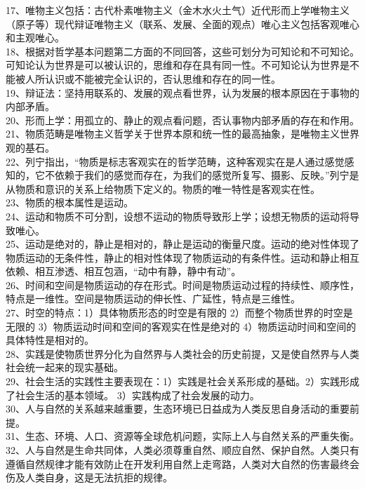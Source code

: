 \documentclass[a4paper,fleqn]{article}
\begin{document}
17、唯物主义包括：古代朴素唯物主义（金木水火土气）近代形而上学唯物主义（原子等）现代辩证唯物主义（联系、发展、全面的观点）唯心主义包括客观唯心和主观唯心。 \\
18、根据对哲学基本问题第二方面的不同回答，这些可划分为可知论和不可知论。可知论认为世界是可以被认识的，思维和存在具有同一性。不可知论认为世界是不能被人所认识或不能被完全认识的，否认思维和存在的同一性。 \\
19、辩证法：坚持用联系的、发展的观点看世界，认为发展的根本原因在于事物的内部矛盾。 \\
20、形而上学：用孤立的、静止的观点看问题，否认事物内部矛盾的存在和作用。 \\
21、物质范畴是唯物主义哲学关于世界本原和统一性的最高抽象，是唯物主义世界观的基石。 \\
22、列宁指出，“物质是标志客观实在的哲学范畴，这种客观实在是人通过感觉感知的，它不依赖于我们的感觉而存在，为我们的感觉所复写、摄影、反映。”列宁是从物质和意识的关系上给物质下定义的。物质的唯一特性是客观实在性。 \\
23、物质的根本属性是运动。 \\
24、运动和物质不可分割，设想不运动的物质导致形上学；设想无物质的运动将导致唯心。 \\
25、运动是绝对的，静止是相对的，静止是运动的衡量尺度。运动的绝对性体现了物质运动的无条件性，静止的相对性体现了物质运动的有条件性。运动和静止相互依赖、相互渗透、相互包涵，“动中有静，静中有动”。 \\
26、时间和空间是物质运动的存在形式。时间是物质运动过程的持续性、顺序性，特点是一维性。空间是物质运动的伸长性、广延性，特点是三维性。 \\
27、时空的特点：1）具体物质形态的时空是有限的 2）而整个物质世界的时空是无限的 3）物质运动时间和空间的客观实在性是绝对的 4）物质运动时间和空间的具体特性是相对的。 \\
28、实践是使物质世界分化为自然界与人类社会的历史前提，又是使自然界与人类社会统一起来的现实基础。 \\
29、社会生活的实践性主要表现在：1）实践是社会关系形成的基础。2）实践形成了社会生活的基本领域。 3）实践构成了社会发展的动力。 \\
30、人与自然的关系越来越重要，生态环境已日益成为人类反思自身活动的重要前提。 \\
31、生态、环境、人口、资源等全球危机问题，实际上人与自然关系的严重失衡。 \\
32、人与自然是生命共同体，人类必须尊重自然、顺应自然、保护自然。人类只有遵循自然规律才能有效防止在开发利用自然上走弯路，人类对大自然的伤害最终会伤及人类自身，这是无法抗拒的规律。 \\
\end{document}
